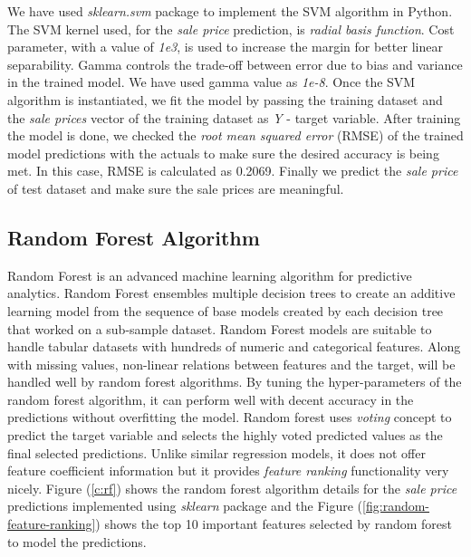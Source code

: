 \documentclass[sigconf]{acmart}
\begin{document}
	We have used {\em sklearn.svm} package to implement the SVM algorithm in Python. The SVM kernel used, for the {\em sale price} prediction, is {\em radial basis function}. Cost parameter, with a value of {\em 1e3}, is used to increase the margin for better linear separability. Gamma controls the trade-off between error due to bias and variance in the trained model. We have used gamma value as {\em 1e-8}. Once the SVM algorithm is instantiated, we fit the model by passing the training dataset and the {\em sale prices} vector of the training dataset as {\em Y} - target variable. After training the model is done, we checked the {\em root mean squared error} (RMSE) of the trained model predictions with the actuals to make sure the desired accuracy is being met. In this case, RMSE is calculated as 0.2069. Finally we predict the {\em sale price} of test dataset and make sure the sale prices are meaningful.
	
	\subsection{Random Forest Algorithm}
	
	Random Forest is an advanced machine learning algorithm for predictive analytics. Random Forest ensembles multiple decision trees to create an additive learning model from the sequence of base models created by each decision tree that worked on a sub-sample dataset. Random Forest models are suitable to handle tabular datasets with hundreds of numeric and categorical features. Along with missing values, non-linear relations between features and the target, will be handled well by random forest algorithms. By tuning the hyper-parameters of the random forest algorithm, it can perform well with decent accuracy in the predictions without overfitting the model. Random forest uses {\em voting} concept to predict the target variable and selects the highly voted predicted values as the final selected predictions. Unlike similar regression models, it does not offer feature coefficient information but it provides {\em feature ranking} functionality very nicely. Figure (\ref{c:rf}) shows the random forest algorithm details for the {\em sale price} predictions implemented using {\em sklearn} package and the Figure (\ref{fig:random-feature-ranking}) shows the top 10 important features selected by random forest to model the predictions.
	
\end{document}
